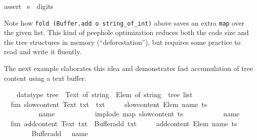 \begin{isabellebody}
assert%
\endisaantiq
\ {\isacharparenleft}s\ {\isacharequal}\ {\isachardoublequote}digits{\isacharcolon}\ {}{}{}{}{}{}{}{}{}{}{\isachardoublequote}{\isacharparenright}{\isacharsemicolon}\isanewline
{\isacharverbatimclose}%
\endisatagML
{\isafoldML}%
%
\isadelimML
%
\endisadelimML
%
\begin{isamarkuptext}%
Note how \verb|fold (Buffer.add o string_of_int)| above saves
  an extra \verb|map| over the given list.  This kind of peephole
  optimization reduces both the code size and the tree structures in
  memory (``deforestation''), but requires some practice to read and
  write it fluently.

  \medskip The next example elaborates this idea and demonstrates fast
  accumulation of tree content using a text buffer.%
\end{isamarkuptext}%
\isamarkuptrue%
%
\isadelimML
%
\endisadelimML
%
\isatagML
{}\isamarkupfalse%
\ {\isacharverbatimopen}\isanewline
\ \ datatype\ tree\ {\isacharequal}\ Text\ of\ string\ {\isacharbar}\ Elem\ of\ string\ {\isacharasterisk}\ tree\ list{\isacharsemicolon}\isanewline
\isanewline
\ \ fun\ slow{\isacharunderscore}content\ {\isacharparenleft}Text\ txt{\isacharparenright}\ {\isacharequal}\ txt\isanewline
\ \ \ \ {\isacharbar}\ slow{\isacharunderscore}content\ {\isacharparenleft}Elem\ {\isacharparenleft}name{\isacharcomma}\ ts{\isacharparenright}{\isacharparenright}\ {\isacharequal}\isanewline
\ \ \ \ \ \ \ \ {\isachardoublequote}{\isacharless}{\isachardoublequote}\ {\isacharcircum}\ name\ {\isacharcircum}\ {\isachardoublequote}{\isachargreater}{\isachardoublequote}\ {\isacharcircum}\isanewline
\ \ \ \ \ \ \ \ implode\ {\isacharparenleft}map\ slow{\isacharunderscore}content\ ts{\isacharparenright}\ {\isacharcircum}\isanewline
\ \ \ \ \ \ \ \ {\isachardoublequote}{\isacharless}{\isacharslash}{\isachardoublequote}\ {\isacharcircum}\ name\ {\isacharcircum}\ {\isachardoublequote}{\isachargreater}{\isachardoublequote}\isanewline
\isanewline
\ \ fun\ add{\isacharunderscore}content\ {\isacharparenleft}Text\ txt{\isacharparenright}\ {\isacharequal}\ Buffer{\isachardot}add\ txt\isanewline
\ \ \ \ {\isacharbar}\ add{\isacharunderscore}content\ {\isacharparenleft}Elem\ {\isacharparenleft}name{\isacharcomma}\ ts{\isacharparenright}{\isacharparenright}\ {\isacharequal}\isanewline
\ \ \ \ \ \ \ \ Buffer{\isachardot}add\ {\isacharparenleft}{\isachardoublequote}{\isacharless}{\isachardoublequote}\ {\isacharcircum}\ name\ {\isacharcircum}\ {\isachardoublequote}{\isachargreater}{\isachardoublequote}{\isacharparenright}\ {\isacharhash}{\isachargreater}\isanewline

\end{isabellebody}
